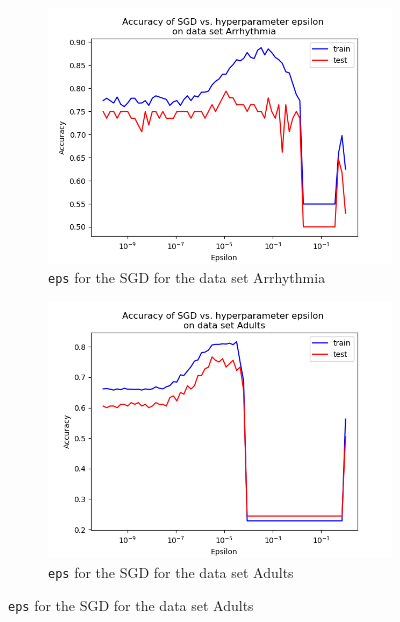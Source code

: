 \documentclass{article}
\begin{document}
\begin{figure}[H]
	\begin{subfigure}[t]{0.45\linewidth}
		\includegraphics[width=\linewidth]{figs/hyperparams/arrhythmia_sgd_eps.png}
		\caption{\texttt{eps} for the SGD for the data set Arrhythmia}
	\end{subfigure}
	\begin{subfigure}[t]{0.45\linewidth}
		\includegraphics[width=\linewidth]{figs/hyperparams/adults_sgd_eps.png}
		\caption{\texttt{eps} for the SGD for the data set Adults}
	\end{subfigure}


\end{figure}
\end{document}
